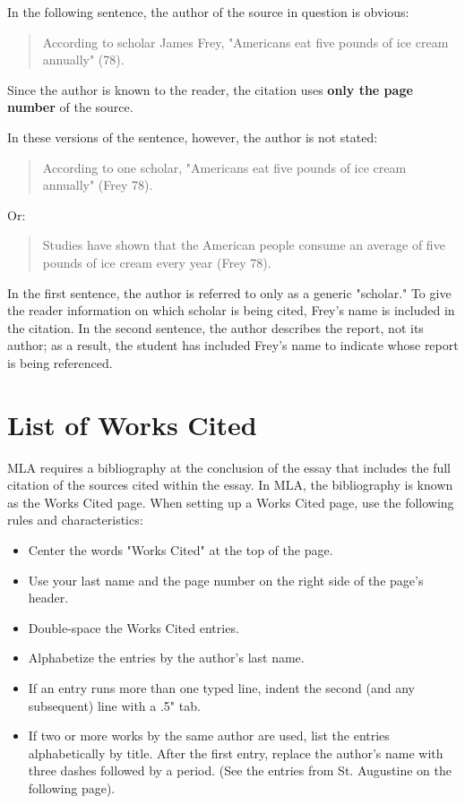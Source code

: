 In the following sentence, the author of the source in question is obvious:

\begin{quote}According to scholar James Frey, "Americans eat five pounds of ice cream 
annually" (78).
\end{quote}

Since the author is known to the reader, the citation uses \textbf{only the page 
number} of the source.

In these versions of the sentence, however, the author is not stated:

\begin{quote}
According to one scholar, "Americans eat five pounds of ice cream annually" (Frey 78).
\end{quote}
Or:

\begin{quote}
Studies have shown that the American people consume an average of five pounds of ice 
cream every year (Frey 78).
\end{quote}
In the first sentence, the author is referred to only as a generic "scholar." To give the 
reader information on which scholar is being cited, Frey's name is included in the 
citation. In the second sentence, the author describes the report, not its author; as a 
result, the student has included Frey's name to indicate whose report is being referenced. 


\section{List of Works Cited}

MLA requires a bibliography at the conclusion of the essay that includes the full 
citation of the sources cited within the essay. In MLA, the bibliography is known as the 
Works Cited page. When setting up a Works Cited page, use the following rules and 
characteristics:

\begin{itemize}
\item Center the words "Works Cited" at the top of the page.
\item Use your last name and the page number on the right side of the page's header.
\item Double-space the Works Cited entries.
\item Alphabetize the entries by the author's last name.
\item If an entry runs more than one typed line, indent the second (and any 
subsequent) line with a .5" tab.
\item If two or more works by the same author are used, list the entries alphabetically 
by title. After the first entry, replace the author's name with three dashes followed by a 
period. (See the entries from St. Augustine on the following page).
\end{itemize}


